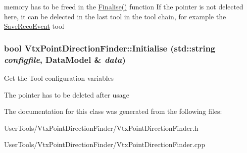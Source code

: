 memory has to be freed in the \hyperlink{classVtxPointDirectionFinder_a4dd5a07dc9b778c3bf633ba21f75792d}{Finalise()} function If the pointer is not delected here, it can be delected in the last tool in the tool chain, for example the \hyperlink{classSaveRecoEvent}{SaveRecoEvent} tool \hypertarget{classVtxPointDirectionFinder_aa95039075c595e8fc3d873158036ea1f}{
\subsubsection[{Initialise}]{\setlength{\rightskip}{0pt plus 5cm}bool VtxPointDirectionFinder::Initialise (std::string {\em configfile}, \/  {\bf DataModel} \& {\em data})}}
\label{classVtxPointDirectionFinder_aa95039075c595e8fc3d873158036ea1f}


Get the Tool configuration variables

The pointer has to be deleted after usage 

The documentation for this class was generated from the following files:\begin{DoxyCompactItemize}
\item 
UserTools/VtxPointDirectionFinder/VtxPointDirectionFinder.h\item 
UserTools/VtxPointDirectionFinder/VtxPointDirectionFinder.cpp\end{DoxyCompactItemize}

